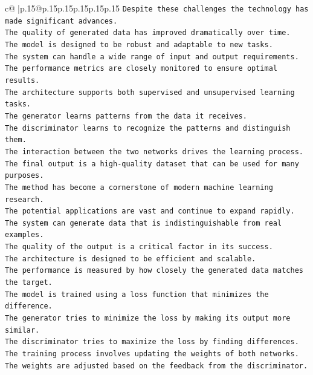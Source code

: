 \documentclass{article}
\begin{document}
{\begin{supertabular}{c@{$\;$}|p{.15\linewidth}@{}p{.15\linewidth}p{.15\linewidth}p{.15\linewidth}p{.15\linewidth}p{.15\linewidth}}
{{{\texttt{Despite these challenges the technology has made significant advances.  } \\
\texttt{The quality of generated data has improved dramatically over time.  } \\
\texttt{The model is designed to be robust and adaptable to new tasks.  } \\
\texttt{The system can handle a wide range of input and output requirements.  } \\
\texttt{The performance metrics are closely monitored to ensure optimal results.  } \\
\texttt{The architecture supports both supervised and unsupervised learning tasks.  } \\
\texttt{The generator learns patterns from the data it receives.  } \\
\texttt{The discriminator learns to recognize the patterns and distinguish them.  } \\
\texttt{The interaction between the two networks drives the learning process.  } \\
\texttt{The final output is a high{-}quality dataset that can be used for many purposes.  } \\
\texttt{The method has become a cornerstone of modern machine learning research.  } \\
\texttt{The potential applications are vast and continue to expand rapidly.  } \\
\texttt{The system can generate data that is indistinguishable from real examples.  } \\
\texttt{The quality of the output is a critical factor in its success.  } \\
\texttt{The architecture is designed to be efficient and scalable.  } \\
\texttt{The performance is measured by how closely the generated data matches the target.  } \\
\texttt{The model is trained using a loss function that minimizes the difference.  } \\
\texttt{The generator tries to minimize the loss by making its output more similar.  } \\
\texttt{The discriminator tries to maximize the loss by finding differences.  } \\
\texttt{The training process involves updating the weights of both networks.  } \\
\texttt{The weights are adjusted based on the feedback from the discriminator.  } \\
}}}
\end{supertabular}}
\end{document}
